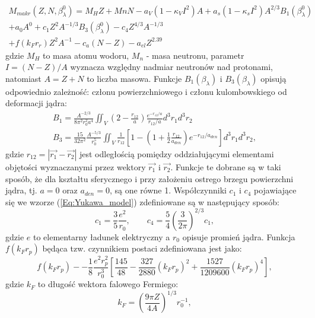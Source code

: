 \documentclass[a4paper,polish,twoside]{article}
\numberwithin{equation}{section}
\begin{document}
\begin{equation} \label{Eq:Yukawa_model}
\begin{gathered}
M_{makr}(Z,N,\beta^0_{\lambda})=M_{H}Z+M{n}N-a_{V}(1-\kappa_{V}I^2)A+a_{s}(1-\kappa_{s}I^2)A^{2/3}B_{1}(\beta^{0}_{\lambda}) \\
+a_{0}A^{0}+c_{1}Z^{2}A^{-1/3}B_{3}(\beta^{0}_{\lambda})-c_{4}Z^{4/3}A^{-1/3} \\
+f(k_{F}r_{r})Z^{2}A^{-1}-c_{a}(N-Z)-a_{el}Z^{2.39}
\end{gathered}
\end{equation}
gdzie $M_{H}$ to masa atomu wodoru, $M_{n}$ - masa neutronu, parametr $I=(N-Z)/A$ wyznacza względny nadmiar neutronów nad protonami, natomiast $A=Z+N$ to liczba masowa. Funkcje $B_{1}(\beta_{\lambda})$ i $B_{3}(\beta_{\lambda})$ opisują odpowiednio zależność: członu powierzchniowego i członu kulombowskiego od deformacji jądra:
\begin{gather}
B_{1}=\frac{A^{-2/3}}{8\pi^{2}r^{2}_{0}a^{4}}\iint_V\left(2-\frac{r_{12}}{a}\right)\frac{e^{-r_{12}/a}}{r_{12}/a}d^{3}r_{1}d^{3}r_{2} \\
B_{3}=\frac{15}{32\pi^{2}}\frac{A^{-5/3}}{r^{5}_{0}}\iint_V\frac{1}{r_{12}}\left[1-\left(1+\frac{1}{2}\frac{r_{12}}{a_{den}}\right)e^{-r_{12}/a_{den}}\right]d^{3}r_{1}d^{3}r_{2},
\end{gather}
gdzie $r_{12}=\left|\vec{r_{1}}-\vec{r_{2}}\right|$ jest odległością pomiędzy oddziałującymi elementami objętości wyznaczanymi przez wektory $\vec{r_{1}}$ i $\vec{r_{2}}$. Funkcje te dobrane są w taki sposób, że dla kształtu sferycznego i przy założeniu ostrego brzegu powierzchni jądra, tj. $a=0$ oraz $a_{den}=0$, są one równe 1. Współczynniki $c_{1}$ i $c_{4}$ pojawiające się we wzorze (\ref{Eq:Yukawa_model}) zdefiniowane są w następujący sposób:
\begin{equation}
c_{1}=\frac{3}{5}\frac{e^{2}}{r_{0}}, \qquad c_{4}=\frac{5}{4}\left(\frac{3}{2\pi}\right)^{2/3}c_{1},
\end{equation}
gdzie $e$ to elementarny ładunek elektryczny a $r_{0}$ opisuje promień jądra. Funkcja $f(k_{F}r_{p})$ będąca tzw. czynnikiem postaci zdefiniowana jest jako:
\begin{equation}
f(k_{F}r_{p})--\frac{1}{8}\frac{e^{2}r^{2}_{p}}{r^{3}_{0}}\left[\frac{145}{48}-\frac{327}{2880}(k_{F}r_{p})^{2}+\frac{1527}{1209600}(k_{F}r_{p})^{4}\right],
\end{equation}
gdzie $k_{F}$ to długość wektora falowego Fermiego:
\begin{equation}
k_{F}=\left(\frac{9\pi Z}{4A}\right)^{1/3}r^{-1}_{0},
\end{equation}
\end{document}
